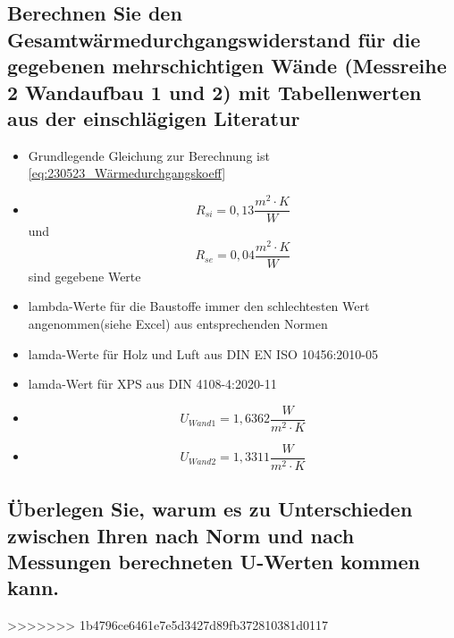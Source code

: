 \subsection{Berechnen Sie den Gesamtwärmedurchgangswiderstand für die gegebenen mehrschichtigen Wände (Messreihe 2 Wandaufbau 1 und 2) mit Tabellenwerten aus der einschlägigen Literatur}
\begin{itemize}
\item Grundlegende Gleichung zur Berechnung ist \autoref*{eq:230523_Wärmedurchgangskoeff}
\item $$R_{si}=0,13\frac{m^2 \cdot K}{W}$$ und $$R_{se}=0,04\frac{m^2 \cdot K}{W}$$ sind gegebene Werte
\item lambda-Werte für die Baustoffe immer den schlechtesten Wert angenommen(siehe Excel) aus entsprechenden Normen
\item lamda-Werte für Holz\cite[S.20]{lamda-holz-luft} und Luft\cite[S. 15]{lamda-holz-luft} aus DIN EN ISO 10456:2010-05
\item lamda-Wert für XPS \cite[S.23]{lamda-xps} aus DIN 4108-4:2020-11
\item $$U_{Wand 1}=1,6362 \frac{W}{m^2 \cdot K}$$
\item $$U_{Wand 2}=1,3311 \frac{W}{m^2 \cdot K}$$
\end{itemize}


\subsection{Überlegen Sie, warum es zu Unterschieden zwischen Ihren nach Norm und nach Messungen berechneten U-Werten kommen kann.}
>>>>>>> 1b4796ce6461e7e5d3427d89fb372810381d0117
